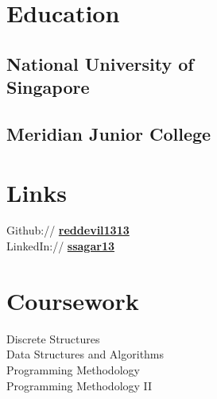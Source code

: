 \documentclass[]{deedy-resume-openfont}
\begin{document}
%
%
\lastupdated

%
%

%
%

\begin{minipage}[t]{0.33\textwidth} 


\section{Education} 

\subsection{National University of \\ Singapore}
\sectionsep

\subsection{Meridian Junior College}
\sectionsep


\section{Links}
Github:// \href{https://github.com/reddevil1313}{\bf reddevil1313} \\
LinkedIn://  \href{https://www.linkedin.com/in/ssagar13}{\bf ssagar13}
\sectionsep


\section{Coursework}
Discrete Structures \\
Data Structures and Algorithms \\
Programming Methodology \\
Programming Methodology II \\
\sectionsep


\end{minipage}
\end{document}

